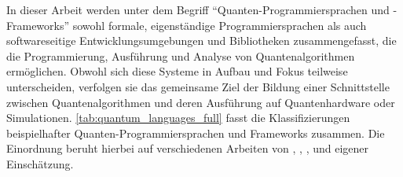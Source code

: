 In dieser Arbeit werden unter dem Begriff \enquote{Quanten-Programmiersprachen und -Frameworks} sowohl formale, eigenständige Programmiersprachen als auch softwareseitige Entwicklungsumgebungen und Bibliotheken zusammengefasst, die die Programmierung, Ausführung und Analyse von Quantenalgorithmen ermöglichen. Obwohl sich diese Systeme in Aufbau und Fokus teilweise unterscheiden, verfolgen sie das gemeinsame Ziel der Bildung einer Schnittstelle zwischen Quantenalgorithmen und deren Ausführung auf Quantenhardware oder Simulationen. \autoref{tab:quantum_languages_full} fasst die Klassifizierungen beispielhafter Quanten-Programmiersprachen und Frameworks zusammen. Die Einordnung beruht hierbei auf verschiedenen Arbeiten von \autocite{singhSurveyAvailableTools2024a}, \autocite{ferreiraExploratoryStudyUsage2025}, \autocite{garhwal_quantum_2021}, \autocite{serranoQuantumSoftwareComponents2023a} und eigener Einschätzung.

